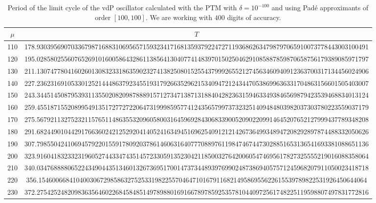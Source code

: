 \documentclass[final]{article}
\begin{document}
\begin{table}
	\caption{Period of the limit cycle of the vdP oscillator calculated with the PTM with $\delta=10^{-100}$ and using Pad\'e approximants of order $[100,100]$. We are working with $400$ digits of accuracy. }
	\bigskip
	\label{table_T_vdP2}
	\begin{center}
		\begin{tabular}{|c|c|}
			\hline
			$\mu$ &   $T$    \\
			\hline
			110	&   178.9303956907033679871688310695657159323417168135937922472711936862634798797065910073778443003100491  \\
			120	& 	195.0285802556076526910160058643286113856413040774148397015025046291085887859870658756179389085971797  \\
			130	& 	211.1307477804160260130832331863590232741382508015255437999265521274563460940912363700317134456024906  \\
			140	& 	227.2362316910533012521444863792345519317926635296215340947212434470538699636331704863156601505403007  \\
			150	& 	243.3445145087953931135502082098788891571273471387131884042823631594633493846569879423539468834013124  \\
			160	& 	259.4551871552089954913517277272206473199985957741243565799737323251409484803982037303780223559037179  \\
			170	& 	275.5679211327523211576511486355320960580031645969284306833900520902209914645207652127999437789348208  \\
			180	& 	291.6824490104429176636024212529204140524163494516962540912121426736499348947208292897874488332050626  \\
			190	& 	307.7985504241069457922015591780920378614606316407770889761198474674473028851653136541693381088651136  \\
			200	& 	323.9160418323323196052744334743514572330591352304211850032764200605474695617827325555219016088358064  \\
			210	& 	340.0347688880652243490443513460132673695170014737344893976990248738694057571245968207911050023418718  \\
			220	& 	356.154600668410400306729858632752533198225570464710167911682149586955622615539789822531926450644064  \\
			230	& 	372.2754252482098363564602268458485149789880169166789785925357810440972561748225119598807497831772816  \\

\end{tabular}
\end{center}
\end{table}
\end{document}
